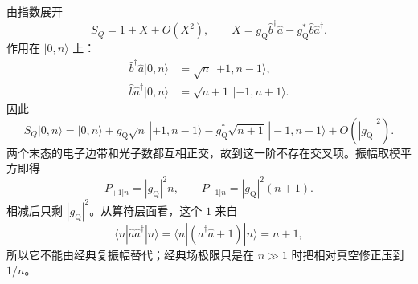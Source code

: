 \begin{exbox}
由指数展开
\begin{equation*}
 S_Q=1+X+O(X^2),
 \qquad
 X=g_{\mathrm Q}\hat b^\dagger\hat a-g_{\mathrm Q}^*\hat b\hat a^\dagger.
\end{equation*}
作用在 $|0,n\rangle$ 上：
\begin{align*}
 \hat b^\dagger\hat a|0,n\rangle
 &=\sqrt n\,|+1,n-1\rangle,\\
 \hat b\hat a^\dagger|0,n\rangle
 &=\sqrt{n+1}\,|-1,n+1\rangle.
\end{align*}
因此
\begin{equation*}
 S_Q|0,n\rangle
 =|0,n\rangle
 +g_{\mathrm Q}\sqrt n\,|+1,n-1\rangle
 -g_{\mathrm Q}^*\sqrt{n+1}\,|-1,n+1\rangle
 +O(|g_{\mathrm Q}|^2).
\end{equation*}
两个末态的电子边带和光子数都互相正交，故到这一阶不存在交叉项。振幅取模平方即得
\begin{equation*}
 P_{+1|n}=|g_{\mathrm Q}|^2n,
 \qquad
 P_{-1|n}=|g_{\mathrm Q}|^2(n+1).
\end{equation*}
相减后只剩 $|g_{\mathrm Q}|^2$。从算符层面看，这个 $1$ 来自
\begin{equation*}
 \langle n|\hat a\hat a^\dagger|n\rangle
 =\langle n|(\hat a^\dagger\hat a+1)|n\rangle=n+1,
\end{equation*}
所以它不能由经典复振幅替代；经典场极限只是在 $n\gg1$ 时把相对真空修正压到 $1/n$。
\end{exbox}



